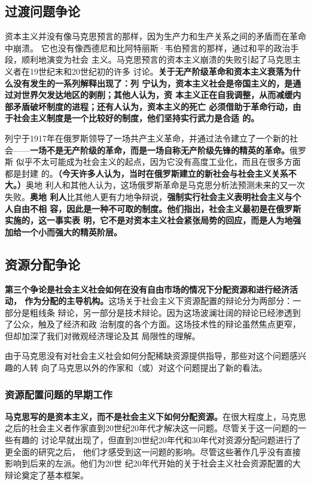 \subsection{过渡问题争论}

资本主义并没有像马克思预言的那样，因为生产力和生产关系之间的矛盾而在革命中崩溃。
它也没有像西德尼和比阿特丽斯·韦伯预言的那样，通过和平的政治手段，顺利地演变为社会
主义。马克思预言的资本主义崩溃的失败引起了马克思主义者在19世纪末和20世纪初的许多
讨论。\textbf{关于无产阶级革命和资本主义衰落为什么没有发生的一系列解释出现了：列
  宁认为，资本主义社会是帝国主义的，是通过对世界欠发达地区的剥削；其他人认为，资
  本主义正在自我调整，从而减缓内部矛盾破坏制度的进程；还有人认为，资本主义的死亡
  必须借助于革命行动，由于社会主义制度是一个比较好的制度，他们坚持实行武力是合适
  的。}

列宁于1917年在俄罗斯领导了一场共产主义革命，并通过法令建立了一个新的社
会——\textbf{一场不是无产阶级的革命，而是一场自称无产阶级先锋的精英的革命。}俄罗斯
似乎不太可能成为社会主义的起点，因为它没有高度工业化，而且在很多方面都是封建
的。\textbf{（今天许多人认为，当时在俄罗斯建立的新社会与社会主义关系不大。）}奥地
利人和其他人认为，这场俄罗斯革命是马克思分析法预测未来的又一次失败。\textbf{奥地
  利人}比其他人更有力地争辩说，\textbf{强制实行社会主义表明社会主义与个人自由不相
  容，因此是一种不可取的制度。他们指出，社会主义最初是在俄罗斯实施的，这一事实表
  明，它不是对资本主义社会紧张局势的回应，而是人为地强加给一个小而强大的精英阶层。}

\subsection{资源分配争论}

\textbf{第三个争论是社会主义社会如何在没有自由市场的情况下分配资源和进行经济活动，
  作为分配的主导机构。}这场关于社会主义下资源配置的辩论分为两部分：一部分是粗线条
辩论，另一部分是技术辩论。因为这场波澜壮阔的辩论已经渗透到了公众，触及了经济和政
治制度的各个方面。这场技术性的辩论虽然焦点更窄，但却加深了我们对微观经济理论及其
局限性的理解。

由于马克思没有对社会主义社会如何分配稀缺资源提供指导，那些对这个问题感兴趣的人转
向了马克思以外的作家和（或）对这个问题提出了新的看法。

\subsubsection{资源配置问题的早期工作}

\textbf{马克思写的是资本主义，而不是社会主义下如何分配资源。}在很大程度上，马克思
之后的社会主义者作家直到20世纪20年代才解决这一问题。尽管关于这一问题的一些有趣的
讨论早就出现了，但直到20世纪20年代和30年代对资源分配问题进行了更全面的研究之后，
他们才感受到这一问题的影响。尽管这些著作几乎没有直接影响到后来的左派。他们为20世
纪20年代开始的关于社会主义社会资源配置的大辩论奠定了基本框架。

